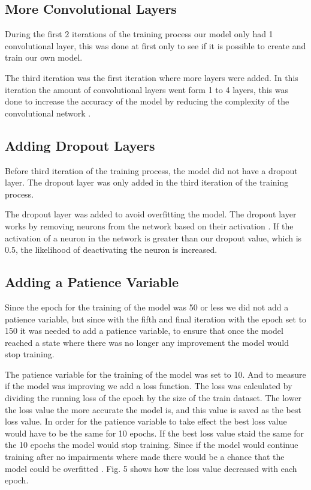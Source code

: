 \documentclass[conference]{IEEEtran}
\begin{document}
\subsection{More Convolutional Layers}

During the first 2 iterations of the training process our model only had 1 convolutional layer, this was done at first only to see if it is possible to create and train our own model. 

The third iteration was the first iteration where more layers were added. In this iteration the amount of convolutional layers went form 1 to 4 layers, this was done to increase the accuracy of the model by reducing the complexity of the convolutional network \cite{b3}.

\subsection{Adding Dropout Layers}

Before third iteration of the training process, the model did not have a dropout layer. The dropout layer was only added in the third iteration of the training process.

The dropout layer was added to avoid overfitting the model. The dropout layer works by removing neurons from the network based on their activation \cite{b5}. If the activation of a neuron in the network is greater than our dropout value, which is 0.5, the likelihood of deactivating the neuron is increased.

\subsection{Adding a Patience Variable}

Since the epoch for the training of the model was 50 or less we did not add a patience variable, but since with the fifth and final iteration with the epoch set to 150 it was needed to add a patience variable, to ensure that once the model reached a state where there was no longer any improvement the model would stop training.

The patience variable for the training of the model was set to 10. And to measure if the model was improving we add a loss function. The loss was calculated by dividing the running loss of the epoch by the size of the train dataset. The lower the loss value the more accurate the model is, and this value is saved as the best loss value. In order for the patience variable to take effect the best loss value would have to be the same for 10 epochs. If the best loss value staid the same for the 10 epochs the model would stop training. Since if the model would continue training after no impairments where made there would be a chance that the model could be overfitted \cite{b5}. Fig. 5 shows how the loss value decreased with each epoch.
\end{document}
